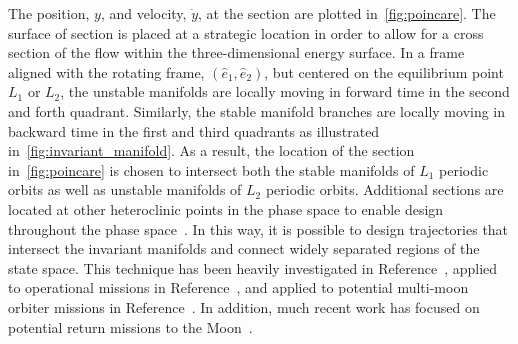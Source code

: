 \documentclass[preprint]{elsarticle}
\begin{document}
The position, \( y \), and velocity, \( \dot{y} \), at the \Poincare section are plotted in~\cref{fig:poincare}.
The surface of section is placed at a strategic location in order to allow for a cross section of the flow within the three-dimensional energy surface. 
In a frame aligned with the rotating frame, \( ( \hat{e}_1, \hat{e}_2 ) \), but centered on the equilibrium point \( L_1 \) or \( L_2\), the unstable manifolds are locally moving in forward time in the second and forth quadrant. 
Similarly, the stable manifold branches are locally moving in backward time in the first and third quadrants as illustrated in~\cref{fig:invariant_manifold}. 
As a result, the location of the section in~\cref{fig:poincare} is chosen to intersect both the stable manifolds of \( L_1 \) periodic orbits as well as unstable manifolds of \( L_2 \) periodic orbits.
Additional \Poincare sections are located at other heteroclinic points in the phase space to enable design throughout the phase space~\cite{koon2011}.
In this way, it is possible to design trajectories that intersect the invariant manifolds and connect widely separated regions of the state space. 
This technique has been heavily investigated in Reference~, applied to operational missions in Reference~, and applied to potential multi-moon orbiter missions in Reference~.
In addition, much recent work has focused on potential return missions to the Moon~\cite{zanzottera2012,campagnola2012,mingotti2011,ozimek2010a,mingotti2009}.
\end{document}
